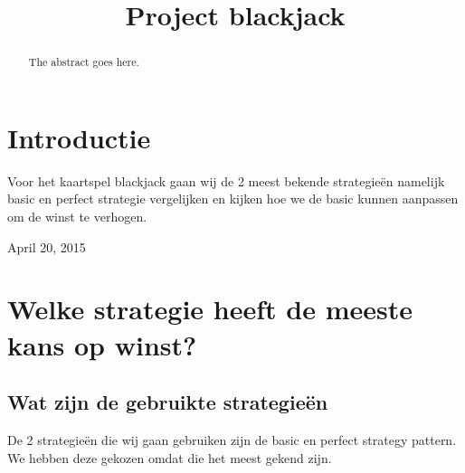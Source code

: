 \documentclass[conference]{IEEEtran}
\begin{document}
\title{Project blackjack}

\author{
\and
{}
\and
{}
\and
{}
}


\maketitle

\begin{abstract}
The abstract goes here.
\end{abstract}

\IEEEpeerreviewmaketitle

\section{Introductie}
Voor het kaartspel blackjack gaan wij de 2 meest bekende strategieën namelijk basic en perfect strategie vergelijken en kijken hoe we de basic kunnen aanpassen om de winst te verhogen.

 
\hfill April 20, 2015

\section{Welke strategie heeft de meeste kans op winst?}

\subsection{Wat zijn de gebruikte strategieën}
De 2 strategieën die wij gaan gebruiken zijn de basic en perfect strategy pattern. We hebben deze gekozen omdat die het meest gekend zijn.
\end{document}
